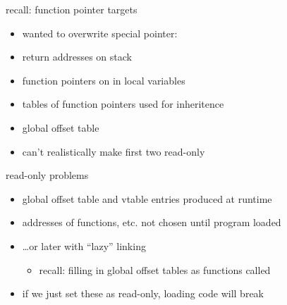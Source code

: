 \begin{frame}{recall: function pointer targets}
    \begin{itemize}
    \item wanted to overwrite special pointer:
    \vspace{.5cm}
    \item return addresses on stack
    \item function pointers on in local variables
    \item tables of function pointers used for inheritence
    \item global offset table
    \vspace{.5cm}
    \item can't realistically make first two read-only
    \end{itemize}
\end{frame}

\begin{frame}{read-only problems}
    \begin{itemize}
    \item global offset table and vtable entries produced at runtime
    \item addresses of functions, etc. not chosen until program loaded
    \item \ldots or later with ``lazy'' linking
        \begin{itemize}
        \item recall: filling in global offset tables as functions called
        \end{itemize}
    \vspace{.5cm}
    \item if we just set these as read-only, loading code will break
    \end{itemize}
\end{frame}


